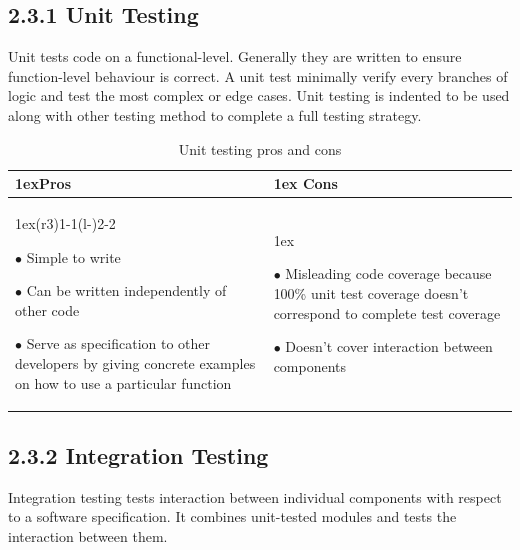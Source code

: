 \documentclass[12pt]{report}
\begin{document}
\subsection*{2.3.1 Unit Testing}
\par\noindent
Unit tests code on a functional-level. Generally they are written to ensure function-level behaviour is correct. A unit test minimally verify every branches of logic and test the most complex or edge cases. Unit testing is indented to be used along with other testing method to complete a full testing strategy.

\begin{table}[ht]
\begin{tabularx}{\linewidth}{>{\parskip1ex}X@{\kern4\tabcolsep}>{\parskip1ex}X}
\toprule
\hfil\bfseries Pros & \hfil\bfseries Cons
\\\cmidrule(r{3\tabcolsep}){1-1}\cmidrule(l{-\tabcolsep}){2-2}

$\bullet$ Simple to write\par
$\bullet$ Can be written independently of other code\par
$\bullet$ Serve as specification to other developers by giving concrete examples on how to use a particular function\par

&

$\bullet$ Misleading code coverage because 100\% unit test coverage doesn't correspond to complete test coverage \par
$\bullet$ Doesn't cover interaction between components \par

\\\bottomrule
\end{tabularx}
\caption{Unit testing pros and cons}
\end{table}
\vspace{-10pt}
\subsection*{2.3.2 Integration Testing}
\par\noindent
Integration testing tests interaction between individual components with respect to a software specification. It combines unit-tested modules and tests the interaction between them.
\end{document}
